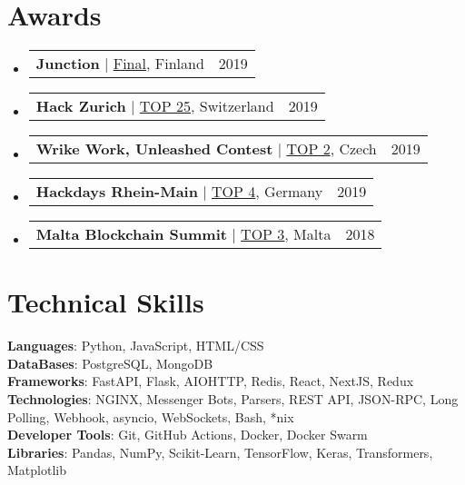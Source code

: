 \documentclass[letterpaper,11pt]{article}
\makeatletter
\newcommand{\resumeItem}[1]{
  \item\small{
    {#1 \vspace{-2pt}}
  }
}
\newcommand{\resumeAwardHeading}[2]{
    \item
    \begin{tabular*}{0.97\textwidth}{l@{\extracolsep{\fill}}r}
      \small#1 & #2 \\
    \end{tabular*}\vspace{-10pt}
}
\newcommand{\resumeSubHeadingListStart}{\begin{itemize}[leftmargin=0.15in, label={}]}
\newcommand{\resumeSubHeadingListEnd}{\end{itemize}}
\newcommand{\resumeItemListStart}{\begin{itemize}}
\newcommand{\resumeItemListEnd}{\end{itemize}\vspace{-5pt}}
\makeatother
\begin{document}
\section{Awards}
  \resumeSubHeadingListStart
    \resumeAwardHeading
        {\textbf{Junction} $|$ \underline{Final}, Finland}{2019}
    \resumeAwardHeading
        {\textbf{Hack Zurich} $|$ \underline{TOP 25}, Switzerland}{2019}
    \resumeAwardHeading
        {\textbf{Wrike Work, Unleashed Contest} $|$ \underline{TOP 2}, Czech}{2019}
    \resumeAwardHeading
        {\textbf{Hackdays Rhein-Main} $|$ \underline{TOP 4}, Germany}{2019}
    \resumeAwardHeading
        {\textbf{Malta Blockchain Summit} $|$ \underline{TOP 3}, Malta}{2018}
  \resumeSubHeadingListEnd
\vspace{0pt}


\section{Technical Skills}
 \begin{itemize}[leftmargin=0.15in, label={}]
    \small{\item{
     \textbf{Languages}{: Python, JavaScript, HTML/CSS} \\
     \textbf{DataBases}{: PostgreSQL, MongoDB} \\
     \textbf{Frameworks}{: FastAPI, Flask, AIOHTTP, Redis, React, NextJS, Redux} \\
     \textbf{Technologies}{: NGINX, Messenger Bots, Parsers, REST API, JSON-RPC, Long Polling, Webhook, asyncio, WebSockets, Bash, *nix} \\
     \textbf{Developer Tools}{: Git, GitHub Actions, Docker, Docker Swarm} \\
     \textbf{Libraries}{: Pandas, NumPy, Scikit-Learn, TensorFlow, Keras, Transformers, Matplotlib}
    }}
 \end{itemize}


\end{document}
